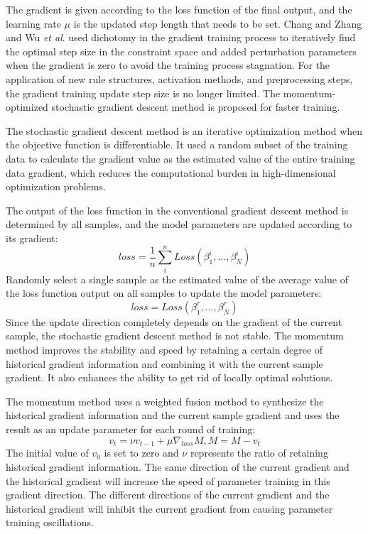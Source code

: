 \documentclass{ieeeaccess}
\begin{document}
The gradient is given according to the loss function of the final output,
and the learning rate $\mu$ is the updated step length that needs to be set.
Chang and Zhang\cite{a11} and Wu \textit{et al}.\cite{a13} used dichotomy in the gradient training process to iteratively find the optimal step size in the constraint space and
added perturbation parameters when the gradient is zero to avoid the training process stagnation.
For the application of new rule structures, activation methods, and preprocessing steps, the gradient training update step size is no longer limited.
The momentum-optimized stochastic gradient descent method is proposed for faster training.

The stochastic gradient descent method is an iterative optimization method when the objective function is differentiable.
It used a random subset of the training data to calculate the gradient value as the estimated value of the entire training data gradient,
which reduces the computational burden in high-dimensional optimization problems.

The output of the loss function in the conventional gradient descent method is determined by all samples,
and the model parameters are updated according to its gradient:
\begin{equation}
    loss=\frac{1}{n}\sum_i^nLoss(\beta_1^i,...,\beta_N^i)
\end{equation}
Randomly select a single sample as the estimated value of the average value of the loss function output on all samples to update the model parameters:
\begin{equation}
    loss=Loss(\beta_1^r,...,\beta_N^r)
\end{equation}
Since the update direction completely depends on the gradient of the current sample, the stochastic gradient descent method is not stable.
The momentum method improves the stability and speed by retaining a certain degree of historical gradient information and combining it with the current sample gradient.
It also enhances the ability to get rid of locally optimal solutions.

The momentum method uses a weighted fusion method to synthesize the historical gradient information and the current sample gradient
and uses the result as an update parameter for each round of training:
\begin{equation}
    v_t=\nu v_{t-1}+\mu\nabla_{loss}M,M=M-v_t
\end{equation}
The initial value of $v_0$ is set to zero and $\nu$ represents the ratio of retaining historical gradient information.
The same direction of the current gradient and the historical gradient will increase the speed of parameter training in this gradient direction.
The different directions of the current gradient and the historical gradient will inhibit the current gradient from causing parameter training oscillations.
\end{document}
